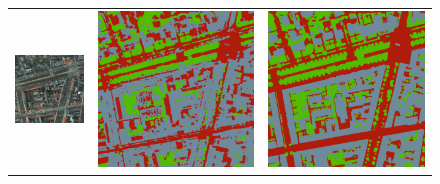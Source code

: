 \begin{figure}[t]
\centering
\bgroup
\def\arraystretch{1.8}
\begin{tabular}{c c c c c c c c c c c c}

\multicolumn{4}{c}{
\includegraphics[height=0.277\textwidth]{experiments2_files/545_17_img.png}} & 
\multicolumn{4}{c}{
\includegraphics[height=0.277\textwidth]{experiments2_files/545_17_preds.png}} & 
\multicolumn{4}{c}{
\includegraphics[height=0.277\textwidth]{experiments2_files/545_17_gt.png}} \\


\end{tabular}
\end{figure}
